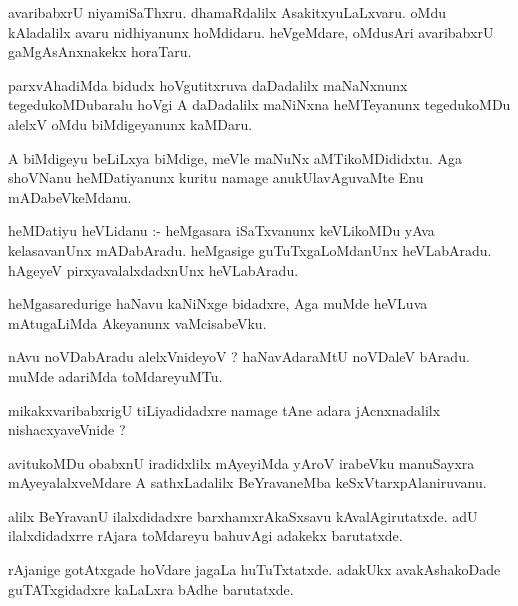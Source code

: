 \documentclass{article}
\begin{document}
\begin{mn}
avaribabxrU  niyamiSaThxru.  dhamaRdalilx  AsakitxyuLaLxvaru.  oMdu  kAladalilx  avaru  nidhiyanunx  
hoMdidaru.  heVgeMdare,  oMdusAri  avaribabxrU  gaMgAsAnxnakekx  horaTaru.
\end{mn}

\begin{mn}
parxvAhadiMda  bidudx hoVgutitxruva  daDadalilx  maNaNxnunx  tegedukoMDubaralu  hoVgi  A  daDadalilx  maNiNxna  
heMTeyanunx  tegedukoMDu  alelxV  oMdu  biMdigeyanunx  kaMDaru.
\end{mn}

\begin{mn}
A  biMdigeyu  beLiLxya  biMdige,  meVle  maNuNx  aMTikoMDididxtu.  Aga  shoVNanu  heMDatiyanunx  kuritu  namage  
anukUlavAguvaMte  Enu  mADabeVkeMdanu.
\end{mn}

\begin{mn}
heMDatiyu  heVLidanu :- heMgasara  iSaTxvanunx  keVLikoMDu  yAva  kelasavanUnx  mADabAradu.  heMgasige  
guTuTxgaLoMdanUnx  heVLabAradu.  hAgeyeV  pirxyavalalxdadxnUnx  heVLabAradu.
\end{mn}

\begin{mn}
heMgasaredurige  haNavu  kaNiNxge  bidadxre,  Aga  muMde  heVLuva  mAtugaLiMda Akeyanunx  vaMcisabeVku.
\end{mn}

\begin{mn}
nAvu  noVDabAradu  alelxVnideyoV ?  haNavAdaraMtU  noVDaleV bAradu.  muMde  adariMda  toMdareyuMTu.
\end{mn}

\begin{mn}
mikakxvaribabxrigU  tiLiyadidadxre  namage  tAne  adara  jAcnxnadalilx  nishacxyaveVnide ?
\end{mn}

\begin{mn}
avitukoMDu  obabxnU  iradidxlilx  mAyeyiMda  yAroV  irabeVku  manuSayxra  mAyeyalalxveMdare  A  
sathxLadalilx  BeYravaneMba  keSxVtarxpAlaniruvanu.
\end{mn}

\begin{mn}
alilx  BeYravanU  ilalxdidadxre  barxhamxrAkaSxsavu  kAvalAgirutatxde.  adU  ilalxdidadxrre  rAjara  
toMdareyu  bahuvAgi  adakekx  barutatxde.
\end{mn}

\begin{mn}
rAjanige  gotAtxgade  hoVdare  jagaLa  huTuTxtatxde.  adakUkx  avakAshakoDade  guTATxgidadxre  kaLaLxra bAdhe  barutatxde.
\end{mn}
\end{document}
